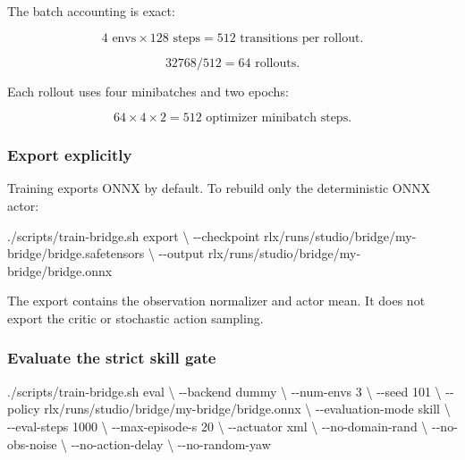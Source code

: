 \documentclass[
  american,
  11pt,
  letterpaper,
]{article}
\newenvironment{Shaded}{\begin{snugshade}}{\end{snugshade}}
\newcommand{\AttributeTok}[1]{\textcolor[rgb]{0.13,0.29,0.53}{#1}}
\newcommand{\DataTypeTok}[1]{\textcolor[rgb]{0.13,0.29,0.53}{#1}}
\newcommand{\ExtensionTok}[1]{#1}
\newcommand{\NormalTok}[1]{#1}
\renewenvironment{Shaded}{\par\smallskip}{\par\smallskip}
\begin{document}
The batch accounting is exact:

\[
4\text{ envs}\times128\text{ steps}=512
\text{ transitions per rollout}.
\]

\[
32768/512=64\text{ rollouts}.
\]

Each rollout uses four minibatches and two epochs:

\[
64\times4\times2=512
\text{ optimizer minibatch steps}.
\]

\subsubsection{Export explicitly}\label{export-explicitly}

Training exports ONNX by default. To rebuild only the deterministic ONNX
actor:

\begin{Shaded}
\begin{Highlighting}[]
\ExtensionTok{./scripts/train{-}bridge.sh}\NormalTok{ export }\DataTypeTok{\textbackslash{}}
  \AttributeTok{{-}{-}checkpoint}\NormalTok{ rlx/runs/studio/bridge/my{-}bridge/bridge.safetensors }\DataTypeTok{\textbackslash{}}
  \AttributeTok{{-}{-}output}\NormalTok{ rlx/runs/studio/bridge/my{-}bridge/bridge.onnx}
\end{Highlighting}
\end{Shaded}

The export contains the observation normalizer and actor mean. It does
not export the critic or stochastic action sampling.

\subsubsection{Evaluate the strict skill
gate}\label{evaluate-the-strict-skill-gate}

\begin{Shaded}
\begin{Highlighting}[]
\ExtensionTok{./scripts/train{-}bridge.sh}\NormalTok{ eval }\DataTypeTok{\textbackslash{}}
  \AttributeTok{{-}{-}backend}\NormalTok{ dummy }\DataTypeTok{\textbackslash{}}
  \AttributeTok{{-}{-}num{-}envs}\NormalTok{ 3 }\DataTypeTok{\textbackslash{}}
  \AttributeTok{{-}{-}seed}\NormalTok{ 101 }\DataTypeTok{\textbackslash{}}
  \AttributeTok{{-}{-}policy}\NormalTok{ rlx/runs/studio/bridge/my{-}bridge/bridge.onnx }\DataTypeTok{\textbackslash{}}
  \AttributeTok{{-}{-}evaluation{-}mode}\NormalTok{ skill }\DataTypeTok{\textbackslash{}}
  \AttributeTok{{-}{-}eval{-}steps}\NormalTok{ 1000 }\DataTypeTok{\textbackslash{}}
  \AttributeTok{{-}{-}max{-}episode{-}s}\NormalTok{ 20 }\DataTypeTok{\textbackslash{}}
  \AttributeTok{{-}{-}actuator}\NormalTok{ xml }\DataTypeTok{\textbackslash{}}
  \AttributeTok{{-}{-}no{-}domain{-}rand} \DataTypeTok{\textbackslash{}}
  \AttributeTok{{-}{-}no{-}obs{-}noise} \DataTypeTok{\textbackslash{}}
  \AttributeTok{{-}{-}no{-}action{-}delay} \DataTypeTok{\textbackslash{}}
  \AttributeTok{{-}{-}no{-}random{-}yaw}
\end{Highlighting}
\end{Shaded}
\end{document}
